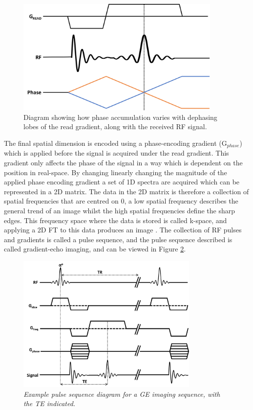 \begin{figure}
    \centering
    \includegraphics[width=0.9\textwidth]{Figures/Theory/RePhasing.png}
    \caption{Diagram showing how phase accumulation varies with dephasing lobes of the read gradient, along with the received \ac{RF} signal.}
    \label{fig:enter-label}
\end{figure}

The final spatial dimension is encoded using a phase-encoding gradient (G$_{phase}$) which is applied before the signal is acquired under the read gradient. This gradient only affects the phase of the signal in a way which is dependent on the position in real-space. By changing linearly changing the magnitude of the applied phase encoding gradient a set of 1D spectra are acquired which can be represented in a 2D matrix. The data in the 2D matrix is therefore a collection of spatial frequencies that are centred on 0, a low spatial frequency describes the general trend of an image whilst the high spatial frequencies define the sharp edges. This frequency space where the data is stored is called k-space, and applying a 2D \ac{FT} to this data produces an image \cite{Lauterbur1973ImageResonance, Mansfield1977Multi-planarEchoes}. The collection of \ac{RF} pulses and gradients is called a pulse sequence, and the pulse sequence described is called gradient-echo imaging, and can be viewed in Figure \ref{fig:theory:GRE}.

\begin{figure}
    \centering
    \includegraphics[width=0.8\textwidth]{Figures/Theory/GRE_sequence.png}
    \caption{\textit{Example pulse sequence diagram for a \ac{GE} imaging sequence, with the \ac{TE} indicated.}}
    \label{fig:theory:GRE}
\end{figure}

